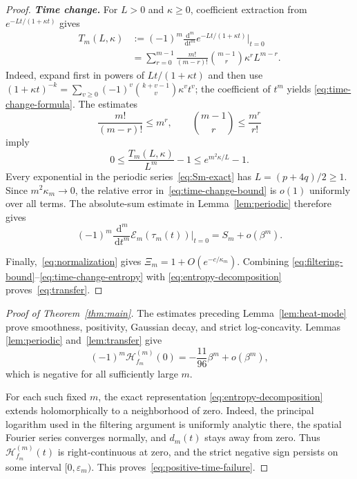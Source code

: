 \documentclass[10pt,letterpaper,journal]{IEEEtran}
\newcommand{\cH}{\mathcal{H}}
\newcommand{\cE}{\mathcal{E}}
\newcommand{\dd}{\,\mathrm{d}}
\theoremstyle{plain}
\theoremstyle{definition}
\begin{document}
\begin{proof}
\textbf{\textit{Time change.}}
For $L>0$ and $\kappa\ge0$, coefficient extraction from
$e^{-Lt/(1+\kappa t)}$ gives
\begin{equation}
 \begin{aligned}
 T_m(L,\kappa)
 &:=(-1)^m\frac{\dd^m}{\dd t^m}
 e^{-Lt/(1+\kappa t)}\Big|_{t=0}\\
 &=\sum_{r=0}^{m-1}
 \frac{m!}{(m-r)!}\binom{m-1}{r}
 \kappa^rL^{m-r}.
 \end{aligned}
 \label{eq:time-change-formula}
\end{equation}
Indeed, expand first in powers of $Lt/(1+\kappa t)$ and then use
$(1+\kappa t)^{-k}=\sum_{v\ge0}(-1)^v
\binom{k+v-1}{v}\kappa^vt^v$; the coefficient of $t^m$ yields
\eqref{eq:time-change-formula}. The estimates
\[
 \frac{m!}{(m-r)!}\le m^r,
 \qquad
 \binom{m-1}{r}\le\frac{m^r}{r!}
\]
imply
\begin{equation}
 0\le\frac{T_m(L,\kappa)}{L^m}-1
 \le e^{m^2\kappa/L}-1.
 \label{eq:time-change-bound}
\end{equation}
Every exponential in the periodic series~\eqref{eq:Sm-exact} has
$L=(p+4q)/2\ge1$. Since $m^2\kappa_m\to0$, the relative error
in~\eqref{eq:time-change-bound} is $o(1)$ uniformly over all terms. The
absolute-sum estimate in Lemma~\ref{lem:periodic} therefore gives
\begin{equation}
 (-1)^m\frac{\dd^m}{\dd t^m}
 \cE_m(\tau_m(t))\Big|_{t=0}=S_m+o(\beta^m).
 \label{eq:time-change-entropy}
\end{equation}

Finally,~\eqref{eq:normalization} gives
$\Xi_m=1+O(e^{-c/\kappa_m})$. Combining
\eqref{eq:filtering-bound}--\eqref{eq:time-change-entropy} with
\eqref{eq:entropy-decomposition} proves~\eqref{eq:transfer}.
\end{proof}

\begin{proof}[Proof of Theorem~\ref{thm:main}]
The estimates preceding Lemma~\ref{lem:heat-mode} prove smoothness,
positivity, Gaussian decay, and strict log-concavity. Lemmas
\ref{lem:periodic} and~\ref{lem:transfer} give
\[
 (-1)^m\cH_{f_m}^{(m)}(0)
 =-\frac{11}{96}\beta^m+o(\beta^m),
\]
which is negative for all sufficiently large $m$.

For each such fixed $m$, the exact representation
\eqref{eq:entropy-decomposition} extends holomorphically to a neighborhood
of zero. Indeed, the principal logarithm used in the filtering argument is
uniformly analytic there, the spatial Fourier series converges normally, and
$d_m(t)$ stays away from zero. Thus $\cH_{f_m}^{(m)}(t)$ is right-continuous
at zero, and the strict negative sign persists on some interval
$[0,\varepsilon_m)$. This proves~\eqref{eq:positive-time-failure}.
\end{proof}
\end{document}
